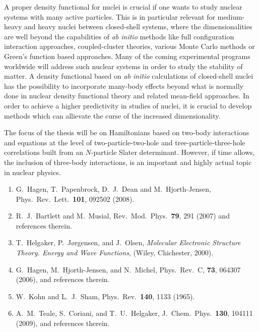 \documentclass[prl,preprint]{revtex4}
\begin{document}
A proper density functional  for nuclei is crucial if one wants to study nuclear systems with many active particles. This is in particular relevant for medium-heavy and heavy nuclei between closed-shell systems, 
where the dimensionalities are well 
beyond the capabilities of {\em ab initio} methods like full configuration interaction approaches, coupled-cluster theories, various Monte Carlo methods or Green's function based approaches. Many of the coming experimental programs worldwide will address such nuclear systems in order to study the stability of matter. 
A density functional based on {\em ab initio} calculations of closed-shell nuclei has the possibility 
to incorporate many-body effects beyond what is normally done in nuclear density functional theory and related
mean-field approaches.  In order to achieve a higher predictivity in studies of nuclei, it is crucial to develop methods which can allievate the curse of the increased dimensionality.

The focus of  the thesis will be on Hamiltonians based on 
 two-body interactions and equations at the level of 
two-particle-two-hole and tree-particle-three-hole correlations built from an $N$-particle Slater determinant. However, if time allows, the inclusion of three-body interactions, is an important and highly actual topic in nuclear physics. 


\begin{enumerate}
\item G.~Hagen, T.~Papenbrock, D.~J.~Dean and M.~Hjorth-Jensen, Phys.~Rev.~Lett.~{\bf 101}, 092502 (2008).
\item R.~J.~Bartlett and M.~Musial, Rev.~Mod.~Phys.~{\bf 79}, 291 (2007) and references therein.
\item T.~Helgaker, P.~J{\o}rgensen, and J.~Olsen, {\em Molecular Electronic Structure Theory. Energy and Wave
  Functions}, (Wiley, Chichester, 2000).
\item G.~Hagen, M.~Hjorth-Jensen, and N.~Michel, Phys.~Rev.~C, {\bf 73}, 064307 (2006), and references therein.
\item W.~Kohn and L.~J.~Sham, Phys.~Rev.~{\bf 140}, 1133 (1965).
\item  A.~M.~Teale, S.~Coriani, and T.~U.~Helgaker, J.~Chem.~Phys.~{\bf 130}, 104111 (2009), and references therein.

\end{enumerate}
\end{document}
